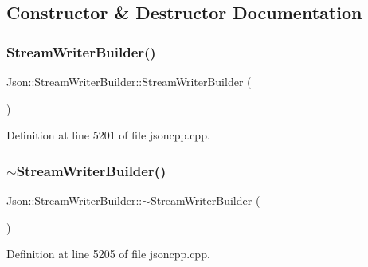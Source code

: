 \subsection{Constructor \& Destructor Documentation}
\hypertarget{class_json_1_1_stream_writer_builder_ab95b76179c152673ad14abc639a46ee4}{}\label{class_json_1_1_stream_writer_builder_ab95b76179c152673ad14abc639a46ee4} 
\subsubsection{\texorpdfstring{Stream\+Writer\+Builder()}{StreamWriterBuilder()}\hspace{0.1cm}{\footnotesize\ttfamily [1/2]}}
{\footnotesize\ttfamily Json\+::\+Stream\+Writer\+Builder\+::\+Stream\+Writer\+Builder (\begin{DoxyParamCaption}{ }\end{DoxyParamCaption})}



Definition at line 5201 of file jsoncpp.\+cpp.

\hypertarget{class_json_1_1_stream_writer_builder_a93263f8ef1e2d22593907075d8f0aaef}{}\label{class_json_1_1_stream_writer_builder_a93263f8ef1e2d22593907075d8f0aaef} 
\subsubsection{\texorpdfstring{$\sim$\+Stream\+Writer\+Builder()}{~StreamWriterBuilder()}\hspace{0.1cm}{\footnotesize\ttfamily [1/2]}}
{\footnotesize\ttfamily Json\+::\+Stream\+Writer\+Builder\+::$\sim$\+Stream\+Writer\+Builder (\begin{DoxyParamCaption}{ }\end{DoxyParamCaption})}



Definition at line 5205 of file jsoncpp.\+cpp.

\hypertarget{class_json_1_1_stream_writer_builder_ab95b76179c152673ad14abc639a46ee4}{}\label{class_json_1_1_stream_writer_builder_ab95b76179c152673ad14abc639a46ee4} 
